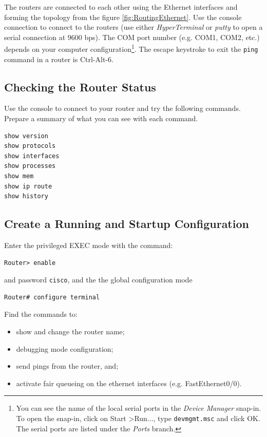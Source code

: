 The routers are connected to each other using the Ethernet interfaces and forming the topology from the figure \ref{fig:RoutingEthernet}. Use the console connection to connect to the routers (use either \emph{HyperTerminal} or \emph{putty} to open a serial connection at 9600 bps). The COM port number (e.g. COM1, COM2, etc.) depends on your computer configuration\footnote{You can see the name of the local serial ports in the \emph{Device Manager} snap-in. To open the snap-in, click on \textsf{Start} \textgreater \textsf{Run...}, type \texttt{devmgmt.msc} and click \textsf{OK}. The serial ports are listed under the \emph{Ports} branch.}. The escape keystroke to exit the \texttt{ping} command in a router is \textsf{Ctrl-Alt-6}.

\subsection{Checking the Router Status}

Use the console to connect to your router and try the following commands. Prepare a summary of what you can see with each command.

\begin{lstlisting}
show version
show protocols
show interfaces
show processes
show mem
show ip route
show history
\end{lstlisting}

\subsection{Create a Running and Startup Configuration}

Enter the privileged EXEC mode with the command:

\begin{lstlisting}
Router> enable
\end{lstlisting}

and password \texttt{\color{blue}cisco}, and the the global configuration mode

\begin{lstlisting}
Router# configure terminal
\end{lstlisting}

Find the commands to:
\begin{itemize}
\item show and change the router name;
\item debugging mode configuration;
\item send pings from the router, and;
\item activate fair queueing on the ethernet interfaces (e.g. FastEthernet0/0).
\end{itemize}

